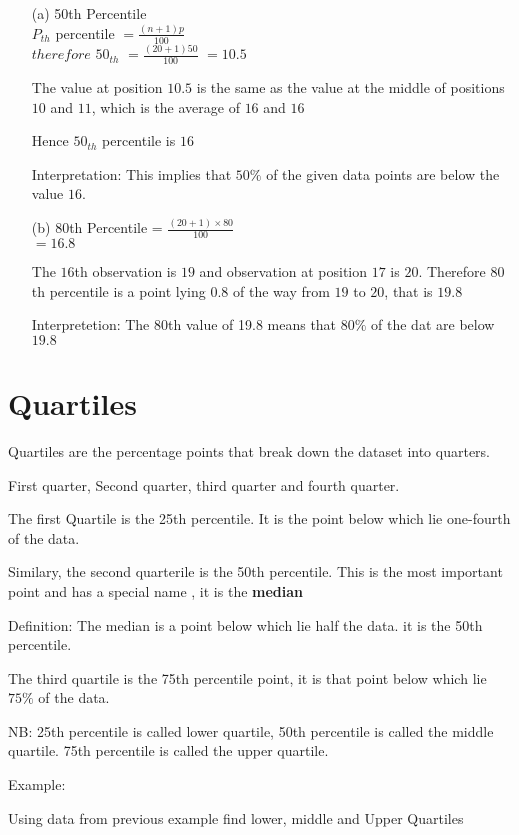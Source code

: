 \begin{enumerate}
    \item[(a)]50th Percentile \\ $P_{th}$ percentile $= \frac{(n + 1)p}{100}$\\
    $therefore$ $50_{th}$ $= \frac{(20 + 1)50}{100}$
    $= 10.5$

    The value at position $10.5$ is the same as the value at the middle of positions $10$ and $11$, which is the average of $16$ and $16$

    Hence $50_{th}$ percentile is $16$

    Interpretation: This implies that $50\%$ of the given data points are below the value $16$.
    \item[(b)] 80th Percentile = $\frac{(20 + 1)\times 80}{100}$ \\ $= 16.8$

        The $16$th observation is $19$ and observation at position $17$ is $20$. Therefore $80$th percentile is a point lying $0.8$ of the way from $19$ to $20$, that is $19.8$

        Interpretetion: The $80$th value of 19.8 means that $80\%$ of the dat are below $19.8$
\end{enumerate}

\section{Quartiles}
Quartiles are the percentage points that break down the dataset into quarters.

First quarter, Second quarter, third quarter and fourth quarter.

The first Quartile is the 25th percentile. It is the point below which lie one-fourth of the data.

Similary, the second quarterile is the 50th percentile. This is the most important point and has a special name , it is the \textbf{median}

Definition: The median is a point below which lie half the data. it is the 50th percentile.

The third quartile is the 75th percentile point, it is that point below which lie $75\%$ of the data.

NB: 25th percentile is called lower quartile, 50th percentile is called the middle quartile. 75th percentile is called the upper quartile.

Example:

Using data from previous example find lower, middle and Upper Quartiles


